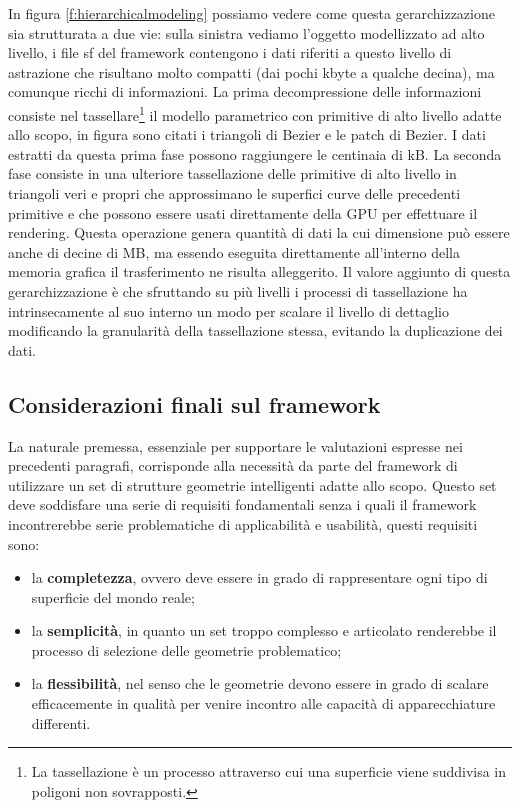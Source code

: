 In figura \ref{f:hierarchicalmodeling} possiamo vedere come questa gerarchizzazione sia strutturata a due vie: sulla sinistra vediamo l'oggetto modellizzato ad alto livello, i file sf del framework contengono i dati riferiti a questo livello di astrazione che risultano molto compatti (dai pochi kbyte a qualche decina), ma comunque ricchi di informazioni.
La prima decompressione delle informazioni consiste nel tassellare\footnote{La tassellazione \`e un processo attraverso cui una superficie viene suddivisa in poligoni non sovrapposti.\cite{book:realtimerendering}} il modello parametrico con primitive di alto livello adatte allo scopo, in figura sono citati i triangoli di Bezier e le patch di Bezier. I dati estratti da questa prima fase possono raggiungere le centinaia di \ac{kB}. La seconda fase consiste in una ulteriore tassellazione delle primitive di alto livello in triangoli veri e propri che approssimano le superfici curve delle precedenti primitive e che possono essere usati direttamente della \ac{GPU} per effettuare il rendering. Questa operazione genera quantit\`a di dati la cui dimensione pu\`o essere anche di decine di \ac{MB}, ma essendo eseguita direttamente all'interno della memoria grafica il trasferimento ne risulta alleggerito. Il valore aggiunto di questa gerarchizzazione \`e che sfruttando su pi\`u livelli i processi di tassellazione ha intrinsecamente al suo interno un modo per scalare il livello di dettaglio modificando la granularit\`a della tassellazione stessa, evitando la duplicazione dei dati.

\subsection{Considerazioni finali sul framework}
La naturale premessa, essenziale per supportare le valutazioni espresse nei precedenti paragrafi, corrisponde alla necessit\`a da parte del framework di utilizzare un set di strutture geometrie intelligenti adatte allo scopo. Questo set deve soddisfare una serie di requisiti fondamentali senza i quali il framework incontrerebbe serie problematiche di applicabilit\`a e usabilit\`a, questi requisiti sono:
\begin{itemize}
	\item  la \textbf{completezza}, ovvero deve essere in grado di rappresentare ogni tipo di superficie del mondo reale;
	\item  la \textbf{semplicit\`a}, in quanto un set troppo complesso e articolato renderebbe il processo di selezione delle geometrie problematico;
	\item  la \textbf{flessibilit\`a}, nel senso che le geometrie devono essere in grado di scalare efficacemente in qualit\`a per venire incontro alle capacit\`a di apparecchiature differenti.
\end{itemize}

